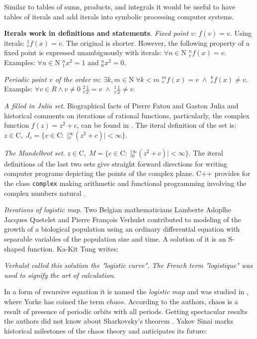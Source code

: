 \documentclass{article}
\begin{document}
Similar to tables of sums, products, and integrals it would be useful to have tables of iterals and add iterals into symbolic processing computer systems.

\textbf{Iterals work in definitions and statements}. \textit{Fixed point $v$}: $f(v) = v$. Using iterals: \CYRI$_{v}^{1}f(x) = v$. The original is shorter. However, the following property of a fixed point is expressed unambiguously with iterals: $\forall n \in \mathrm{N}$ \CYRI$_{v}^n f(x) = v$. Examples: $\forall n \in \mathrm{N}$ \CYRI$_{1}^n x^2 = 1$ and \CYRI$_{0}^n x^2 = 0$.

\textit{Periodic point $v$ of the order $m$}: $\exists k,m  \in \mathrm{N} \; \forall k<m$ \CYRI$_{v}^m f(x) = v \; \wedge$ \CYRI$_{v}^k f(x) \neq v$. Example: $\forall v \in R \wedge v \neq 0$ \CYRI$_{v}^2\frac{1}{x}  = v \; \wedge$ \CYRI$_{v}^1\frac{1}{x}  \neq v$.

\textit{A filled in Julia set}. Biographical facts of Pierre Fatou and Gaston Julia and historical comments on iterations of rational functions, particularly, the complex function $f(z) = z^2 + c$, can be found in \cite[pp. 268 - 275]{mandelbrot}. The iteral definition of the set is: $z \in \mathrm{C}, \; J_c = \{v \in \mathrm{C} : \; $|\CYRI$_{v}^{\infty}(z^2 + c)| < \infty\}$.

\textit{The Mandelbrot set}. $z \in \mathrm{C}, \; M = \{c \in \mathrm{C} : \; $|\CYRI$_{0}^{\infty}(z^2 + c)| < \infty\}$. The iteral definitions of the last two sets give straight forward directions for writing computer programs depicting the points of the complex plane. C++ provides for the class \texttt{complex} making arithmetic and functional programming involving the complex numbers natural \cite[pp. 267 - 274]{stroustrup}.

\textit{Iterations of logistic map}. Two Belgian mathematicians Lamberte Adoplhe Jacques Quetelet and Pierre Fran\c{c}ois Verhulst contributed to modeling of the growth of a biological population using an ordinary differential equation with separable variables of the population size and time. A solution of it is an S-shaped function. Ka-Kit Tung \cite[p. 100]{tung} writes:

\textit{Verhulst called this solution the "logistic curve". The French term "logistique" was used to signify the art of calculation.}

In a form of recursive equation it is named the \textit{logistic map} \cite{feigenbaum} and was studied in \cite{li}, where Yorke has coined the term $chaos$. According to the authors, chaos is a result of presence of periodic orbits with all periods. Getting spectacular results the authors did not know about Sharkovsky's theorem \cite{misiurewicz}. Yakov Sinai \cite{sinai} marks historical milestones of the chaos theory and anticipates its future:
\end{document}
